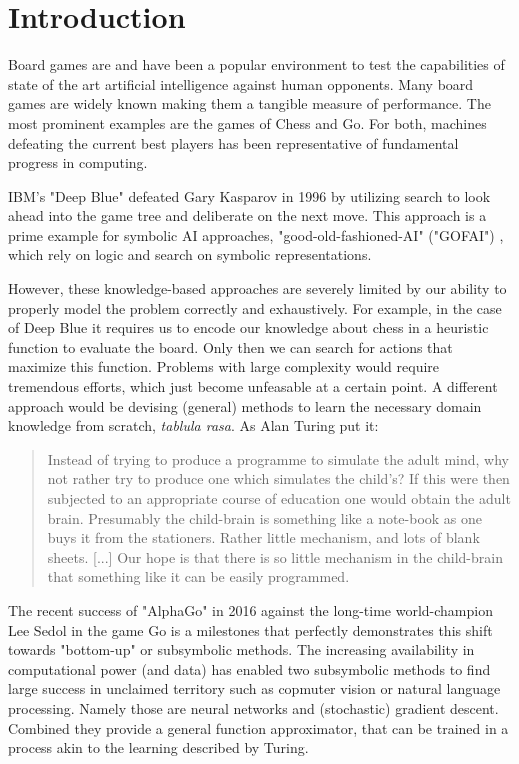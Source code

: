 \chapter{Introduction}

Board games are and have been a popular environment to test the capabilities of state of the art artificial intelligence against human opponents. Many board games are widely known making them a tangible measure of performance. The most prominent examples are the games of Chess and Go. For both, machines defeating the current best players has been representative of fundamental progress in computing.

IBM's "Deep Blue" defeated Gary Kasparov in 1996 \cite{higgins_brief_2017} by utilizing search to look ahead into the game tree and deliberate on the next move. This approach is a prime example for symbolic AI approaches, "good-old-fashioned-AI" ("GOFAI") \cite{haugeland_artificial_1985}, which rely on logic and search on symbolic representations.

However, these knowledge-based approaches are severely limited by our ability to properly model the problem correctly and exhaustively. For example, in the case of Deep Blue it requires us to encode our knowledge about chess in a heuristic function to evaluate the board. Only then we can search for actions that maximize this function. Problems with large complexity would require tremendous efforts, which just become unfeasable at a certain point. A different approach would be devising (general) methods to learn the necessary domain knowledge from scratch,  \emph{tablula rasa}. As Alan Turing put it:

\begin{quote}
    Instead of trying to produce a programme to simulate the adult mind, why not rather try to produce one which simulates the child’s? If this were then subjected to an appropriate course of education one would obtain the adult brain. Presumably the child-brain is something like a note-book as one buys it from the stationers. Rather little mechanism, and lots of blank sheets. [...] Our hope is that there is so little mechanism in the child-brain that something like it can be easily programmed.
    \cite{turing_icomputing_1950}
\end{quote}

The recent success of "AlphaGo" in 2016 against the long-time world-champion Lee Sedol \cite{deepmind_match_nodate} in the game Go is a milestones that perfectly demonstrates this shift towards "bottom-up" or subsymbolic methods. \cite{nilsson_artificial_1998} The increasing availability in computational power (and data) has enabled two subsymbolic methods to find large success in unclaimed territory such as copmuter vision or natural language processing. Namely those are neural networks and (stochastic) gradient descent. Combined they provide a general function approximator, that can be trained in a process akin to the learning described by Turing.

